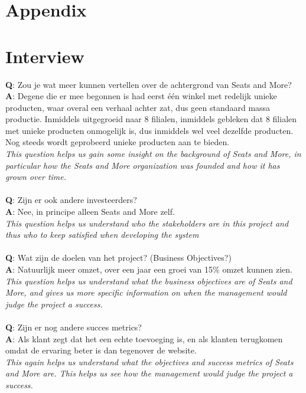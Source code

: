 \documentclass[a4paper]{article}
\begin{document}
\newpage
\section*{Appendix}
\appendix 
\section{Interview}
\textbf{Q}: Zou je wat meer kunnen vertellen over de achtergrond van Seats and More?
\textbf{A}: Degene die er mee begonnen is had eerst \'{e}\'{e}n winkel met redelijk unieke producten, waar overal een verhaal achter zat, dus geen standaard massa productie. Inmiddels uitgegroeid naar 8 filialen, inmiddels gebleken dat 8 filialen met unieke producten onmogelijk is, dus inmiddels wel veel dezelfde producten. Nog steeds wordt geprobeerd unieke producten aan te bieden.\\ 
\textit{This question helps us gain some insight on the background of \textit{Seats and More}, in particular how the \textit{Seats and More} organization was founded and how it has grown over time. }\\
\\
\textit{}
\textbf{Q}: Zijn er ook andere investeerders?\\
\textbf{A}: Nee, in principe alleen Seats and More zelf.\\
\textit{This question helps us understand who the stakeholders are in this project and thus who to keep satisfied when developing the system}\\
\\
\textbf{Q}: Wat zijn de doelen van het project? (Business Objectives?) \\
\textbf{A}: Natuurlijk meer omzet, over een jaar een groei van 15\% omzet kunnen zien.\\
\textit{This question helps us understand what the business objectives are of \textit{Seats and More}, and gives us more specific information on when the management would judge the project a success.}\\
\\
\textbf{Q}: Zijn er nog andere succes metrics?\\
\textbf{A}: Als klant zegt dat het een echte toevoeging is, en als klanten terugkomen omdat de ervaring beter is dan tegenover de website.\\
\textit{This again helps us understand what the objectives and success metrics of \textit{Seats and More} are. This helps us see how the management would judge the project a success.}\\
\end{document}
